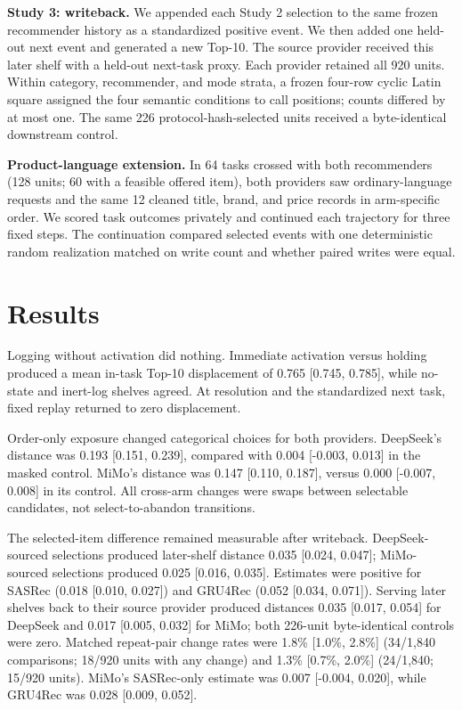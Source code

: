 \documentclass[sigconf,review,anonymous]{acmart}
\begin{document}
\textbf{Study 3: writeback.} We appended each Study 2 selection to the same
frozen recommender history as a standardized positive event. We then added one
held-out next event and generated a new Top-10. The source provider received
this later shelf with a held-out next-task proxy. Each provider retained all
920 units. Within category, recommender, and mode strata,
a frozen four-row cyclic Latin square assigned the four semantic conditions to
call positions; counts differed by at most one. The same 226
protocol-hash-selected units received a byte-identical downstream control.

\textbf{Product-language extension.} In 64 tasks crossed with both recommenders
(128 units; 60 with a feasible offered item), both providers saw
ordinary-language requests and the same 12 cleaned title, brand, and price
records in arm-specific order. We scored task outcomes privately and continued
each trajectory for three fixed steps. The continuation compared selected
events with one deterministic random realization matched on write count and
whether paired writes were equal.

\section{Results}

Logging without activation did nothing. Immediate activation versus holding produced a mean
in-task Top-10 displacement of 0.765 [0.745, 0.785], while no-state and
inert-log shelves agreed. At resolution and the standardized next task, fixed
replay returned to zero displacement.

Order-only exposure changed categorical choices for both providers.
DeepSeek's distance was 0.193 [0.151, 0.239], compared with 0.004 [-0.003,
0.013] in the masked control. MiMo's distance was 0.147 [0.110, 0.187], versus
0.000 [-0.007, 0.008] in its control. All cross-arm changes were swaps between
selectable candidates, not select-to-abandon transitions.

The selected-item difference remained measurable after writeback.
DeepSeek-sourced selections produced later-shelf distance 0.035 [0.024,
0.047]; MiMo-sourced selections produced 0.025 [0.016, 0.035]. Estimates were
positive for SASRec (0.018 [0.010, 0.027]) and GRU4Rec (0.052 [0.034, 0.071]).
Serving later shelves back to their source provider produced distances
0.035 [0.017, 0.054] for DeepSeek and 0.017 [0.005, 0.032] for MiMo; both
226-unit byte-identical controls were zero. Matched repeat-pair change rates were 1.8\%
[1.0\%, 2.8\%] (34/1,840 comparisons; 18/920 units with any change) and 1.3\%
[0.7\%, 2.0\%] (24/1,840; 15/920 units). MiMo's SASRec-only
estimate was 0.007 [-0.004, 0.020], while GRU4Rec was 0.028 [0.009, 0.052].
\end{document}
